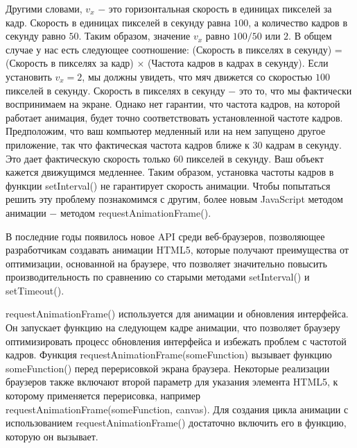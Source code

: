 Другими словами, $v_x$ $-$ это горизонтальная скорость в единицах пикселей за кадр. Скорость в единицах пикселей в секунду равна $100$, а количество кадров в секунду равно $50$. Таким образом, значение $v_x$ равно $100/50$ или $2$. В общем случае у нас есть следующее соотношение: (Скорость в пикселях в секунду) = (Скорость в пикселях за кадр) $×$ (Частота кадров в кадрах в секунду). Если установить $v_x = 2$, мы должны увидеть, что мяч движется со скоростью $100$ пикселей в секунду. Скорость в пикселях в секунду $-$ это то, что мы фактически воспринимаем на экране. Однако нет гарантии, что частота кадров, на которой работает анимация, будет точно соответствовать установленной частоте кадров. Предположим, что ваш компьютер медленный или на нем запущено другое приложение, так что фактическая частота кадров ближе к $30$ кадрам в секунду. Это дает фактическую скорость только $60$ пикселей в секунду. Ваш объект кажется движущимся медленнее. Таким образом, установка частоты кадров в функции setInterval() не гарантирует скорость анимации. Чтобы попытаться решить эту проблему познакомимся с другим, более новым JavaScript методом анимации $-$ методом requestAnimationFrame(). \cite{canvas14}

В последние годы появилось новое API среди веб-браузеров, позволяющее разработчикам создавать анимации HTML5, которые получают преимущества от оптимизации, основанной на браузере, что позволяет значительно повысить производительность по сравнению со старыми методами setInterval() и setTimeout().

requestAnimationFrame() используется для анимации и обновления интерфейса. Он запускает функцию на следующем кадре анимации, что позволяет браузеру оптимизировать процесс обновления интерфейса и избежать проблем с частотой кадров. Функция requestAnimationFrame(someFunction) вызывает функцию someFunction() перед перерисовкой экрана браузера. Некоторые реализации браузеров также включают второй параметр для указания элемента HTML5, к которому применяется перерисовка, например requestAnimationFrame(someFunction, canvas). Для создания цикла анимации с использованием requestAnimationFrame() достаточно включить его в функцию, которую он вызывает.


